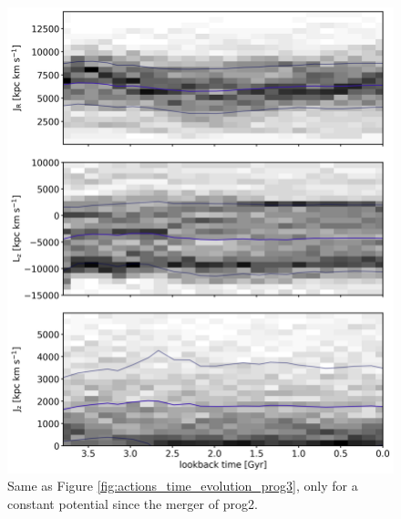 \begin{figure}
\captionsetup{format=plain}
    \centering
	\includegraphics[width=\textwidth]{plots/Dynamics/mean_pot/action_time_evolution_hist_mean_prog3.png}
    \caption{Same as Figure \ref{fig:actions_time_evolution_prog3}, only for a constant potential since the merger of prog2.}\label{fig:actions_time_evolution_mean_pot_prog3}
\end{figure}

